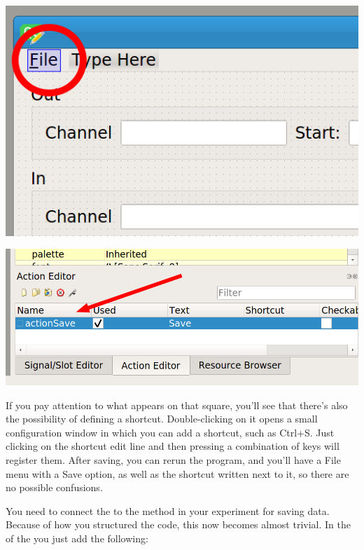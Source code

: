 \begin{minipage}{0.45\linewidth}
    \centering
    \includegraphics[width=\textwidth]{images/Chapter_09/13_menu_file.png}
\end{minipage}
\hspace{0.5cm}
\begin{minipage}{0.45\linewidth}
    \centering
    \includegraphics[width=\textwidth]{images/Chapter_09/13_action_save.png}
\end{minipage}

If you pay attention to what appears on that square, you'll see that there's also the possibility of defining a shortcut. Double-clicking on it opens a small configuration window in which you can add a shortcut, such as Ctrl+S. Just clicking on the shortcut edit line and then pressing a combination of keys will register them. After saving, you can rerun the program, and you'll have a File menu with a Save option, as well as the shortcut written next to it, so there are no possible confusions.

You need to connect the  to the method in your experiment for saving data. Because of how you structured the code, this now becomes almost trivial. In the  of the  you just add the following:

